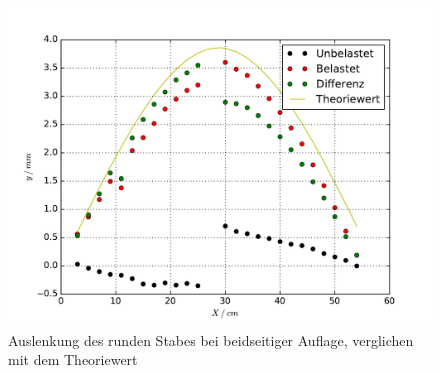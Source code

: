 \begin{figure}
  \centering
  \includegraphics[width = \textwidth]{./Plots/Reihe3.pdf}
  \caption{Auslenkung des runden Stabes bei beidseitiger Auflage, verglichen mit dem Theoriewert}
  \label{fig:Reihe2}
\end{figure}

